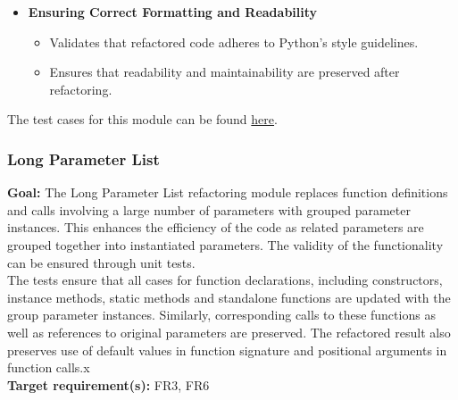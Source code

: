 \documentclass[12pt, titlepage]{article}
\begin{document}
\begin{itemize}
    \item \textbf{Ensuring Correct Formatting and Readability}
      \begin{itemize}
        \item Validates that refactored code adheres to Python’s
          style guidelines.
        \item Ensures that readability and maintainability are
          preserved after refactoring.
      \end{itemize}
  \end{itemize}

  \noindent The test cases for this module can be found
  \href{https://github.com/ssm-lab/capstone--source-code-optimizer/blob/new-poc/tests/refactorers/test_repeated_calls.py}{here}.

  \subsubsection{Long Parameter List}

  \textbf{Goal:} The Long Parameter List refactoring module replaces
  function definitions and calls involving a large number of
  parameters with grouped parameter instances. This enhances the
  efficiency of the code as related parameters are grouped together
  into instantiated parameters. The validity of the functionality can
  be ensured through unit tests.\\

  \noindent The tests ensure that all cases for function
  declarations, including constructors, instance methods, static
  methods and standalone functions are updated with the group
  parameter instances. Similarly, corresponding calls to these
  functions as well as references to original parameters are
  preserved. The refactored result also preserves use of default
  values in function signature and positional arguments in function calls.x\\

  \noindent \textbf{Target requirement(s):} FR3, FR6~\cite{SRS} \\
\end{document}
